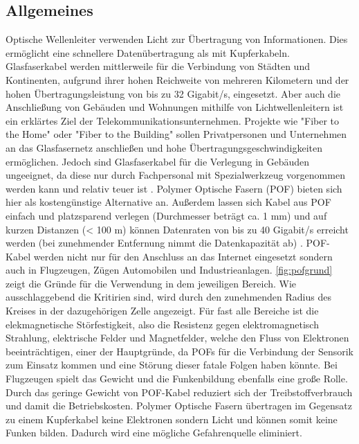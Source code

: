 \subsection{Allgemeines}
\label{subsec:pofallgemeines}

Optische Wellenleiter verwenden Licht zur Übertragung von Informationen. Dies
ermöglicht eine schnellere Datenübertragung als mit Kupferkabeln. Glasfaserkabel
werden mittlerweile für die Verbindung von Städten und Kontinenten, aufgrund
ihrer hohen Reichweite von mehreren Kilometern und der hohen
Übertragungsleistung von bis zu 32 Gigabit/s, eingesetzt. Aber auch die
Anschließung von Gebäuden und Wohnungen mithilfe von Lichtwellenleitern ist ein
erklärtes Ziel der Telekommunikationsunternehmen. Projekte wie
"Fiber to the Home" oder "Fiber
to the Building" sollen Privatpersonen und Unternehmen an das
Glasfasernetz anschließen und hohe Übertragungsgeschwindigkeiten ermöglichen.
Jedoch sind Glasfaserkabel für die Verlegung in Gebäuden ungeeignet, da diese
nur durch Fachpersonal mit Spezialwerkzeug vorgenommen werden kann und relativ
teuer ist \cite{poflan}. Polymer Optische Fasern (POF) bieten sich hier als
kostengünstige Alternative an. Außerdem lassen sich Kabel aus POF einfach und
platzsparend verlegen (Durchmesser beträgt ca. 1 mm) und auf kurzen Distanzen (<
100 m) können Datenraten von bis zu 40 Gigabit/s \cite{pofacgif} erreicht werden
(bei zunehmender Entfernung nimmt die Datenkapazität ab) \cite{pofacprofile}.
POF-Kabel werden nicht nur für den Anschluss an das Internet eingesetzt sondern
auch in Flugzeugen, Zügen Automobilen und Industrieanlagen.
\autoref{fig:pofgrund} zeigt die Gründe für die Verwendung in dem jeweiligen
Bereich. Wie ausschlaggebend die Kritirien sind, wird durch den zunehmenden
Radius des Kreises in der dazugehörigen Zelle angezeigt. Für fast alle Bereiche
ist die elekmagnetische Störfestigkeit, also die Resistenz gegen
elektromagnetisch Strahlung, elektrische Felder und Magnetfelder, welche den
Fluss von Elektronen beeinträchtigen, einer der Hauptgründe, da POFs für die
Verbindung der Sensorik zum Einsatz kommen und eine Störung dieser fatale Folgen
haben könnte. Bei Flugzeugen spielt das Gewicht und die Funkenbildung ebenfalls
eine große Rolle. Durch das geringe Gewicht von POF-Kabel reduziert sich der
Treibstoffverbrauch und damit die Betriebskosten. Polymer Optische Fasern
übertragen im Gegensatz zu einem Kupferkabel keine Elektronen sondern Licht und
können somit keine Funken bilden. Dadurch wird eine mögliche Gefahrenquelle
eliminiert.

